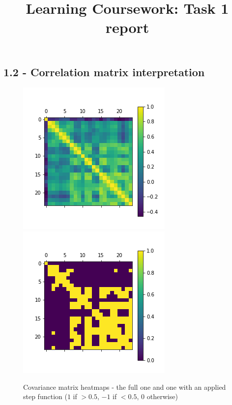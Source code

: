 \documentclass[12pt]{article}
\begin{document}
 
 
\title{Learning Coursework: Task 1 report}


\maketitle
\newpage
\subsection*{1.2 - Correlation matrix interpretation}

\begin{figure}[!htb]
\centering
\includegraphics[scale=0.8]{task1_2_covm.png}
\includegraphics[scale=0.8]{task1_2_covm_stepped.png}
\caption{Covariance matrix heatmaps - the full one and one with an applied step function ($1$ if $> 0.5$, $-1$ if $< 0.5$, $0$ otherwise)}
\label{task1_2_covm}
\end{figure}
\end{document}
